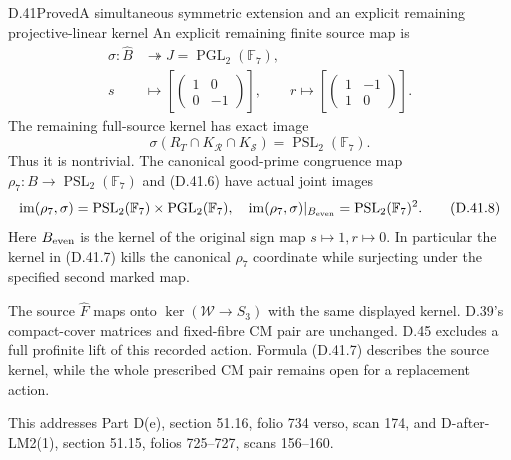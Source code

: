 \begin{statement}{D.41}{Proved}{A simultaneous symmetric extension and an explicit remaining projective-linear kernel}
An explicit remaining finite source map is
\[
 \begin{split}
 \sigma:\widehat B&\twoheadrightarrow
                   J=\operatorname{PGL}_2(\mathbb F_7),\\
 s&\longmapsto
      \left[\begin{pmatrix}1&0\\0&-1\end{pmatrix}\right],
 \qquad
 r\longmapsto
      \left[\begin{pmatrix}1&-1\\1&0\end{pmatrix}\right].
 \end{split}                                             \tag{D.41.6}
\]
The remaining full-source kernel has exact image
\[
 \sigma(R_T\cap K_{\mathcal R}\cap K_{\mathcal S})
       =\operatorname{PSL}_2(\mathbb F_7).                \tag{D.41.7}
\]
Thus it is nontrivial. The canonical good-prime
congruence map $\rho_7:B\to\operatorname{PSL}_2(\mathbb F_7)$
and (D.41.6) have actual joint images
\[
 \operatorname{im}(\rho_7,\sigma)
      =\operatorname{PSL}_2(\mathbb F_7)
             \times\operatorname{PGL}_2(\mathbb F_7),
 \quad
 \operatorname{im}(\rho_7,\sigma)|_{B_{\rm even}}
      =\operatorname{PSL}_2(\mathbb F_7)^2.               \tag{D.41.8}
\]
Here $B_{\rm even}$ is the kernel of the original sign
map $s\mapsto1,r\mapsto0$. In particular the kernel in
(D.41.7) kills the canonical $\rho_7$ coordinate while
surjecting under the specified second marked map.

The source $\widehat F$ maps onto
$\ker(\mathcal W\to S_3)$ with the same displayed
kernel. D.39's compact-cover matrices and fixed-fibre
CM pair are unchanged. D.45 excludes a full profinite lift
of this recorded action. Formula (D.41.7) describes the
source kernel, while the whole prescribed CM pair remains
open for a replacement action.

This addresses Part D(e), section 51.16, folio 734 verso,
scan 174, and D-after-LM2(1), section 51.15, folios
725--727, scans 156--160.
\end{statement}
